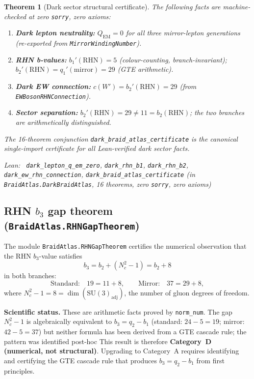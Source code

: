 \documentclass[11pt,a4paper]{article}
\newenvironment{leanref}%
  {\par\smallskip\noindent\begingroup\raggedright\textup{Lean:}~}%
  {\par\endgroup}
\newtheorem{theorem}{Theorem}[section]
\theoremstyle{definition}
\begin{document}
\begin{theorem}[Dark sector structural certificate]\label{thm:dark_braid_atlas}
The following facts are machine-checked at zero \texttt{sorry}, zero axioms:
\begin{enumerate}[leftmargin=1.5em,itemsep=2pt]
  \item \textbf{Dark lepton neutrality:} $Q_\mathrm{EM} = 0$ for all three
    mirror-lepton generations (re-exported from \texttt{MirrorWindingNumber}).
  \item \textbf{RHN b-values:} $b_1'(\mathrm{RHN}) = 5$ (colour-counting, branch-invariant);
    $b_2'(\mathrm{RHN}) = q_1'(\mathrm{mirror}) = 29$ (GTE arithmetic).
  \item \textbf{Dark EW connection:} $c(W') = b_2'(\mathrm{RHN}) = 29$ (from
    \texttt{EWBosonRHNConnection}).
  \item \textbf{Sector separation:} $b_2'(\mathrm{RHN}) = 29 \ne 11 = b_2(\mathrm{RHN})$;
    the two branches are arithmetically distinguished.
\end{enumerate}
The 16-theorem conjunction \lstinline|dark_braid_atlas_certificate| is the canonical
single-import certificate for all Lean-verified dark sector facts.
\begin{leanref}
\lstinline|dark_lepton_q_em_zero|,
\lstinline|dark_rhn_b1|,
\lstinline|dark_rhn_b2|,
\lstinline|dark_ew_rhn_connection|,
\lstinline|dark_braid_atlas_certificate|
\textup{(in \texttt{BraidAtlas.DarkBraidAtlas}, 16 theorems, zero \texttt{sorry},
zero axioms)}
\end{leanref}
\end{theorem}

\subsection{RHN $b_3$ gap theorem (\texttt{BraidAtlas.RHNGapTheorem})}
\label{subsec:rhn_gap_lean}

The module \texttt{BraidAtlas.RHNGapTheorem} certifies the numerical observation
that the RHN $b_3$-value satisfies
\[
  b_3 = b_2 + (N_c^2 - 1) = b_2 + 8
\]
in both branches:
\[
  \text{Standard:}\quad 19 = 11 + 8, \qquad
  \text{Mirror:}\quad 37 = 29 + 8,
\]
where $N_c^2 - 1 = 8 = \dim(\mathrm{SU}(3)_{\mathrm{adj}})$, the number of gluon
degrees of freedom.

\textbf{Scientific status.}
These are arithmetic facts proved by \lstinline|norm_num|.
The gap $N_c^2 - 1$ is algebraically equivalent to $b_3 = q_2 - b_1$
(standard: $24 - 5 = 19$; mirror: $42 - 5 = 37$) but neither formula
has been derived from a GTE cascade rule; the pattern was identified post-hoc
This result is therefore \textbf{Category~D (numerical,
not structural)}.  Upgrading to Category~A requires identifying and certifying
the GTE cascade rule that produces $b_3 = q_2 - b_1$ from first principles.
\end{document}
